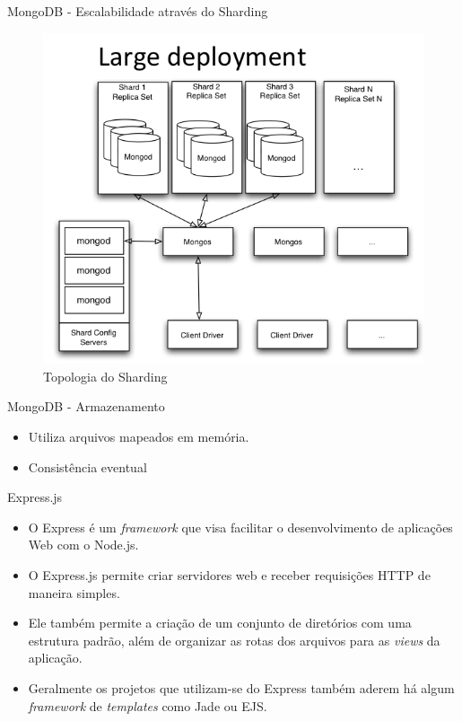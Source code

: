 \documentclass{beamer}
\newlength{\wideitemsep}
\let\olditem\item
\renewcommand{\item}{\setlength{\itemsep}{\wideitemsep}\olditem}
\begin{document}
\begin{frame}{MongoDB - Escalabilidade através do Sharding}
    \begin{figure}[htb]
    \centering
    \includegraphics[scale=0.35]{../images/1sharding_topology.png}
    \caption{Topologia do Sharding}
    \label{fig: shard_top}
    \end{figure}
\end{frame}

\begin{frame}{MongoDB - Armazenamento}
    \begin{itemize}
        \item Utiliza arquivos mapeados
em memória.
        \item Consistência eventual
    \end{itemize}
\end{frame}

\begin{frame}{Express.js}

    \begin{itemize}
        \item O Express é um \textit{framework} que visa facilitar o desenvolvimento de aplicações Web com o Node.js.
        \item O Express.js permite criar servidores web e receber requisições HTTP de maneira simples. 
        \item  Ele também permite a criação de um conjunto de diretórios com uma estrutura padrão, além de organizar as rotas dos arquivos para as \textit{views} da aplicação.
        \item  Geralmente os projetos que utilizam-se do Express também aderem há algum \textit{framework} de \textit{templates} como Jade ou EJS.
    \end{itemize}
\end{frame}
\end{document}
